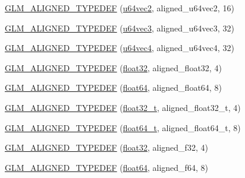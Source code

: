 \begin{DoxyCompactItemize}
\item 
\hyperlink{group__gtx__type__aligned_ga929427a7627940cdf3304f9c050b677d}{G\+L\+M\+\_\+\+A\+L\+I\+G\+N\+E\+D\+\_\+\+T\+Y\+P\+E\+D\+E\+F} (\hyperlink{group__gtc__type__precision_gaddd85665767e5d32aee8516f00c45f59}{u64vec2}, aligned\+\_\+u64vec2, 16)
\item 
\hyperlink{group__gtx__type__aligned_gae373b6c04fdf9879f33d63e6949c037e}{G\+L\+M\+\_\+\+A\+L\+I\+G\+N\+E\+D\+\_\+\+T\+Y\+P\+E\+D\+E\+F} (\hyperlink{group__gtc__type__precision_ga7f104c29d70170cfb2223b29f7985bd4}{u64vec3}, aligned\+\_\+u64vec3, 32)
\item 
\hyperlink{group__gtx__type__aligned_ga53a8a03dca2015baec4584f45b8e9cdc}{G\+L\+M\+\_\+\+A\+L\+I\+G\+N\+E\+D\+\_\+\+T\+Y\+P\+E\+D\+E\+F} (\hyperlink{group__gtc__type__precision_gadafdefd5524bf6a48bb7c47edb787ae5}{u64vec4}, aligned\+\_\+u64vec4, 32)
\item 
\hyperlink{group__gtx__type__aligned_gab3301bae94ef5bf59fbdd9a24e7d2a01}{G\+L\+M\+\_\+\+A\+L\+I\+G\+N\+E\+D\+\_\+\+T\+Y\+P\+E\+D\+E\+F} (\hyperlink{group__gtc__type__precision_ga814f2f65354b6588b067cc5c67a6b340}{float32}, aligned\+\_\+float32, 4)
\item 
\hyperlink{group__gtx__type__aligned_ga75930684ff2233171c573e603f216162}{G\+L\+M\+\_\+\+A\+L\+I\+G\+N\+E\+D\+\_\+\+T\+Y\+P\+E\+D\+E\+F} (\hyperlink{group__gtc__type__precision_gab721f828b41f46b20cf4883b50733d3b}{float64}, aligned\+\_\+float64, 8)
\item 
\hyperlink{group__gtx__type__aligned_gada9b0bea273d3ae0286f891533b9568f}{G\+L\+M\+\_\+\+A\+L\+I\+G\+N\+E\+D\+\_\+\+T\+Y\+P\+E\+D\+E\+F} (\hyperlink{group__gtc__type__precision_ga642737ae3e7c434b366f2191e6944bf2}{float32\+\_\+t}, aligned\+\_\+float32\+\_\+t, 4)
\item 
\hyperlink{group__gtx__type__aligned_ga6e3a2d83b131336219a0f4c7cbba2a48}{G\+L\+M\+\_\+\+A\+L\+I\+G\+N\+E\+D\+\_\+\+T\+Y\+P\+E\+D\+E\+F} (\hyperlink{group__gtc__type__precision_gade966a3eb25ebeb16dd53c40d3fdeb46}{float64\+\_\+t}, aligned\+\_\+float64\+\_\+t, 8)
\item 
\hyperlink{group__gtx__type__aligned_gadbce23b9f23d77bb3884e289a574ebd5}{G\+L\+M\+\_\+\+A\+L\+I\+G\+N\+E\+D\+\_\+\+T\+Y\+P\+E\+D\+E\+F} (\hyperlink{group__gtc__type__precision_ga814f2f65354b6588b067cc5c67a6b340}{float32}, aligned\+\_\+f32, 4)
\item 
\hyperlink{group__gtx__type__aligned_gaa4deaa0dea930c393d55e7a4352b0a20}{G\+L\+M\+\_\+\+A\+L\+I\+G\+N\+E\+D\+\_\+\+T\+Y\+P\+E\+D\+E\+F} (\hyperlink{group__gtc__type__precision_gab721f828b41f46b20cf4883b50733d3b}{float64}, aligned\+\_\+f64, 8)

\end{DoxyCompactItemize}
